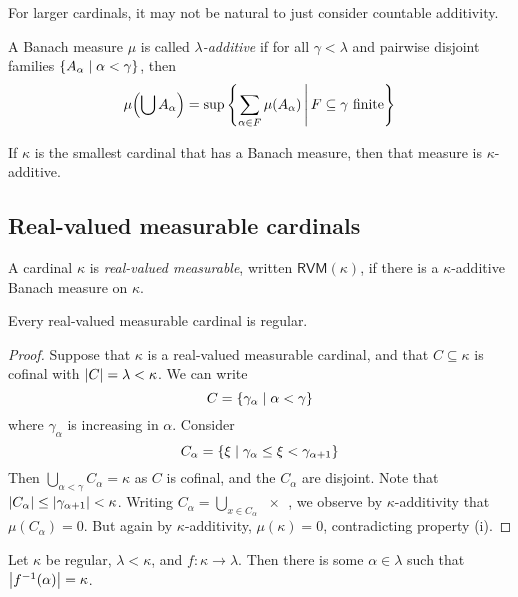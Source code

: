 For larger cardinals, it may not be natural to just consider countable additivity.
\begin{definition}
    A Banach measure \( \mu \) is called \emph{\( \lambda \)-additive} if for all \( \gamma < \lambda \) and pairwise disjoint families \( \qty{A_\alpha \mid \alpha < \gamma} \), then
    \[ \mu\qty(\bigcup A_\alpha) = \sup\qty{\sum_{\alpha \in F} \mu(A_\alpha) \,\middle|\,F \subseteq \gamma \text{ finite}} \]
\end{definition}
\begin{theorem}
    If \( \kappa \) is the smallest cardinal that has a Banach measure, then that measure is \( \kappa \)-additive.
\end{theorem}

\subsection{Real-valued measurable cardinals}
\begin{definition}
    A cardinal \( \kappa \) is \emph{real-valued measurable}, written \( \mathsf{RVM}(\kappa) \), if there is a \( \kappa \)-additive Banach measure on \( \kappa \).
\end{definition}
\begin{proposition}
    Every real-valued measurable cardinal is regular.
\end{proposition}
\begin{proof}
    Suppose that \( \kappa \) is a real-valued measurable cardinal, and that \( C \subseteq \kappa \) is cofinal with \( \abs{C} = \lambda < \kappa \).
    We can write
    \[ C = \qty{\gamma_\alpha \mid \alpha < \gamma} \]
    where \( \gamma_\alpha \) is increasing in \( \alpha \).
    Consider
    \[ C_\alpha = \qty{\xi \mid \gamma_\alpha \leq \xi < \gamma_{\alpha + 1}} \]
    Then \( \bigcup_{\alpha < \gamma} C_\alpha = \kappa \) as \( C \) is cofinal, and the \( C_\alpha \) are disjoint.
    Note that \( \abs{C_\alpha} \leq \abs{\gamma_{\alpha + 1}} < \kappa \).
    Writing \( C_\alpha = \bigcup_{x \in C_\alpha} \qty{x} \), we observe by \( \kappa \)-additivity that \( \mu(C_\alpha) = 0 \).
    But again by \( \kappa \)-additivity, \( \mu(\kappa) = 0 \), contradicting property (i).
\end{proof}
\begin{proposition}
    Let \( \kappa \) be regular, \( \lambda < \kappa \), and \( f : \kappa \to \lambda \).
    Then there is some \( \alpha \in \lambda \) such that \( \abs{f^{-1}(\alpha)} = \kappa \).
\end{proposition}
